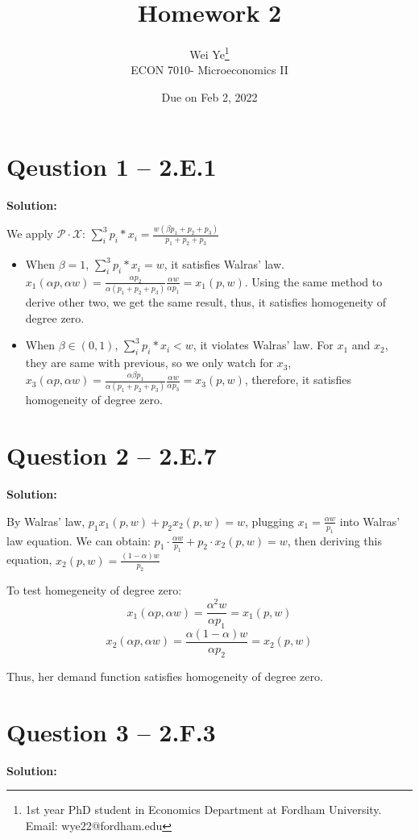 \documentclass[11pt]{article} %
\title{Homework 2}
\author{Wei Ye\footnote{ 1st year PhD student in Economics Department at Fordham University. Email: wye22@fordham.edu}
    \\ ECON 7010- Microeconomics II}
\date{Due on Feb 2, 2022}
\begin{document}
\maketitle

\section{Qeustion 1 -- 2.E.1}
\textbf{Solution:}

We apply $\mathcal{P}\cdot \mathcal{X}$: $\sum_i^3p_i*x_i=\frac{w(\beta p_1+p_2+p_3)}{p_1+p_2+p_3}$

\begin{itemize}
    \item When $\beta=1$, $\sum_i^3p_i*x_i=w$, it satisfies  Walras' law. $x_1(\alpha p,\alpha w)=\frac{\alpha p_2}{\alpha (p_1+p_2+p_3)}\frac{\alpha w}{\alpha p_1}=x_1(p,w)$. Using the same method to derive other two, we get the same result, thus, it satisfies homogeneity of degree zero.
    \item When $\beta\in (0,1)$, $\sum_i^3p_i*x_i<w$, it violates Walras' law. For $x_1$ and $x_2$, they are same with previous, so we only watch for $x_3$, $x_3(\alpha p,\alpha w)=\frac{\alpha \beta p_1}{\alpha (p_1+p_2+p_3)}\frac{\alpha w}{\alpha p_3}=x_3(p,w)$, therefore, it satisfies homogeneity of degree zero.
\end{itemize}

\section{Question 2 -- 2.E.7}
\textbf{Solution:}

By Walras' law, $p_1x_1(p,w)+p_2x_2(p,w)=w$, plugging $x_1=\frac{\alpha w}{p_1}$ into Walras' law equation. We can obtain:
$p_1\cdot \frac{\alpha w}{p_1}+p_2\cdot x_2(p,w)=w$, then deriving this equation, $x_2(p,w)=\frac{(1-\alpha)w}{p_2}$

To test homegeneity of degree zero:
$$x_1(\alpha p,\alpha w)=\frac{\alpha^2w}{\alpha p_1}=x_1(p,w)$$
\begin{equation*}
    x_2(\alpha p,\alpha w)=\frac{\alpha(1-\alpha)w}{\alpha p_2}=x_2(p,w)
\end{equation*}

Thus, her demand function satisfies homogeneity of degree zero.




\section{Question 3 -- 2.F.3}
\textbf{Solution:}
\end{document}

